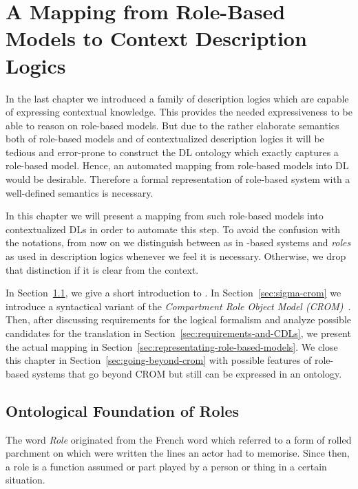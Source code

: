 
\chapter{A Mapping from Role-Based Models to Context Description Logics}
\label{cha:mapping}

In the last chapter we introduced a family of description logics which are capable of expressing
contextual knowledge. This provides the needed expressiveness to be able to reason on role-based
models. But due to the rather elaborate semantics both of role-based models and of contextualized
description logics it will be tedious and error-prone to construct the DL ontology which exactly
captures a role-based model. Hence, an automated mapping from role-based models into DL would be
desirable. Therefore a formal representation of role-based system with a well-defined semantics is
necessary.

In this chapter we will present a mapping from such role-based models into contextualized DLs in
order to automate this step.
%
To avoid the confusion with the notations, from now on we distinguish between \emph{\rosiroles} as
in \rosirole-based systems and \emph{roles} as used in description logics whenever we feel it is
necessary. Otherwise, we drop that distinction if it is clear from the context.
%

In Section~\ref{sec:rosiroles}, we give a short introduction to \rosiroles.  In
Section~\ref{sec:sigma-crom} we introduce a syntactical variant of the \emph{Compartment Role Object
  Model (CROM)}~\cite{KBG-SLE15}.  Then, after discussing requirements for the logical formalism and
analyze possible candidates for the translation in Section~\ref{sec:requirements-and-CDLs}, we
present the actual mapping in Section~\ref{sec:representating-role-based-models}. We close this
chapter in Section~\ref{sec:going-beyond-crom} with possible features of role-based systems that go
beyond CROM but still can be expressed in an ontology.



\section{Ontological Foundation of Roles}
\label{sec:rosiroles}

The word \emph{Role} originated from the French word \emph{\Rosirole} which referred to a form of
rolled parchment on which were written the lines an actor had to memorise.  Since then, a role is a
function assumed or part played by a person or thing in a certain situation.

